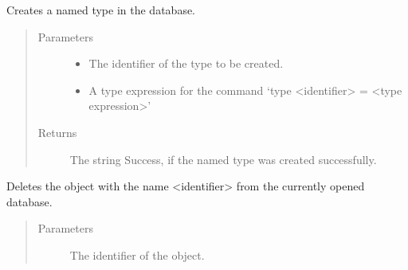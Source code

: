 \documentclass[letterpaper,10pt,english]{sphinxmanual}
\begin{document}
\begin{fulllineitems}
\begin{fulllineitems}
\begin{quote}
\begin{description}
\end{description}\end{quote}

\end{fulllineitems}


\begin{fulllineitems}
\label{\detokenize{index:secondodb.api.secondoapi.Cursor.execute_create_type}}
Creates a named type in the database.
\begin{quote}\begin{description}
\item[{Parameters}] \leavevmode\begin{itemize}
\item {} 
 \textendash{} The identifier of the type to be created.

\item {} 
 \textendash{} A type expression for the command ‘type \textless{}identifier\textgreater{} = \textless{}type expression\textgreater{}’

\end{itemize}

\item[{Returns}] \leavevmode
The string Success, if the named type was created successfully.

\end{description}\end{quote}

\end{fulllineitems}


\begin{fulllineitems}
\label{\detokenize{index:secondodb.api.secondoapi.Cursor.execute_delete}}
Deletes the object with the name \textless{}identifier\textgreater{} from the currently opened database.
\begin{quote}\begin{description}
\item[{Parameters}] \leavevmode
{} \textendash{} The identifier of the object.


\end{description}
\end{quote}
\end{fulllineitems}
\end{fulllineitems}
\end{document}
